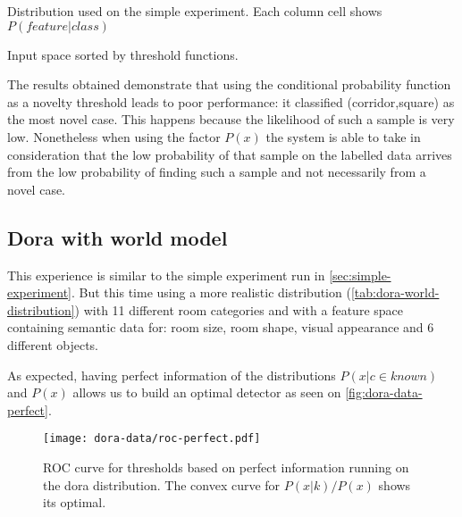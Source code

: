 \documentclass[a4paper]{article}
\begin{document}
\begin{table}[hb]
\begin{center}

\end{center}
\caption{\label{tab:simple-distribution}Distribution used on the simple experiment. Each column cell shows $P(feature|class)$}
\end{table}

\begin{table}
\centering
{}
\qquad
{}
\caption{\label{tab:simple-data-sorted}Input space sorted by threshold functions.}
\end{table}

The results obtained demonstrate that using the conditional probability function
as a novelty threshold leads to poor performance: it classified (corridor,square) as
the most novel case.
This happens because the likelihood of such a sample is very low.
Nonetheless when using the factor $P(x)$ the system is able to take in consideration
that the low probability of that sample on the labelled data arrives from the low
probability of finding such a sample and not necessarily from a novel case.



\subsection{Dora with world model}
\label{sec:dora-experiment}



This experience is similar to the simple experiment run in \autoref{sec:simple-experiment}.
But this time using a more realistic distribution (\autoref{tab:dora-world-distribution}) with
11 different room categories and with a feature space containing semantic data for:
room size, room shape, visual appearance and 6 different objects.

As expected, having perfect information of the distributions $P(x|c \in known)$ and $P(x)$
allows us to build an optimal detector as seen on \autoref{fig:dora-data-perfect}.

\begin{figure}[h]
\centering
\texttt{[image: dora-data/roc-perfect.pdf]}
\caption{ROC curve for thresholds based on perfect information running on the dora distribution.
         The convex curve for $P(x|k)/P(x)$ shows its optimal.}
\label{fig:dora-data-perfect}
\end{figure}
\end{document}
